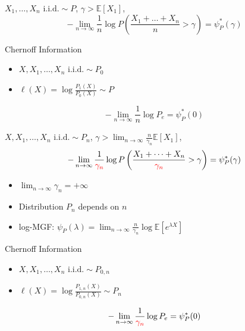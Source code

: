 \documentclass{beamer}
\newcommand\independent{\protect\mathpalette{\protect\independenT}{\perp}}
\def\independenT#1#2{\mathrel{\rlap{$#1#2$}\mkern2mu{#1#2}}}
\begin{document}
\begin{frame}
\begin{theorem}
$X_1, \dots, X_n  \textrm{ i.i.d.} \sim P$, $\gamma > \mathbb{E}[X_1]$, 
\begin{equation*}
-\lim_{n\to \infty}\frac{1}{n} \log P\left(\frac{X_1+ \dots + X_n}{n} > \gamma \right)
= \psi_P^*(\gamma)
\end{equation*}
\end{theorem}
Chernoff Information
\begin{itemize}
\item $X, X_1, \dots, X_n \textrm{ i.i.d.} \sim P_0$
\item $\ell(X) = \log\frac{P_1(X)}{P_0(X)} \sim P$
\end{itemize}
\begin{equation*}
-\lim_{n\to\infty} \frac{1}{n}\log P_e = \psi^*_P(0)
\end{equation*}
\end{frame}
\begin{frame}
\begin{theorem}
$X, X_1, \dots, X_n  \textrm{ i.i.d.} \sim P_n$, $\gamma > \lim_{n\to\infty} \frac{n}{\gamma_n}\mathbb{E}[X_1]$, 
\begin{equation*}
-\lim_{n\to \infty}\frac{1}{\textcolor{red}{\gamma_n}} \log P\left(\frac{X_1+ \dots + X_n}{\textcolor{red}{\gamma_n}} > \gamma \right)
= \psi_P^*(\gamma)
\end{equation*}
\begin{itemize}
\item $\lim_{n\to\infty} \gamma_n = +\infty$
\item Distribution $P_n$ depends on $n$
\item log-MGF: $\psi_P(\lambda)=\lim_{n\to\infty} \frac{n}{\gamma_n} \log \mathbb{E}[e^{\lambda X}]$
\end{itemize}
\end{theorem}
Chernoff Information
\begin{itemize}
\item $X, X_1, \dots, X_n \textrm{ i.i.d.} \sim P_{0,n}$
\item $\ell(X) = \log\frac{P_{1,n}(X)}{P_{0,n}(X)} \sim P_n$
\end{itemize}
\begin{equation*}
-\lim_{n\to\infty} \frac{1}{\textcolor{red}{\gamma_n}}\log P_e = \psi^*_P(0)
\end{equation*}
\end{frame}
\end{document}
